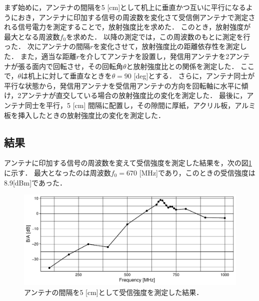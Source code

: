 \documentclass[uplatex,dvipdfmx,a4j,12pt]{jsarticle}
\begin{document}
まず始めに，アンテナの間隔を5 [cm]として机上に垂直かつ互いに平行になるようにおき，アンテナに印加する信号の周波数を変化さて受信側アンテナで測定される信号電力を測定することで，放射強度比を求めた．
このとき，放射強度が最大となる周波数$f_0$を求めた．
以降の測定では，この周波数のもとに測定を行った．
次にアンテナの間隔$r$を変化させて，放射強度比の距離依存性を測定した．
また，適当な距離$r$を介してアンテナを設置し，発信用アンテナを2アンテナが張る面内で回転させ，その回転角$\theta$と放射強度比との関係を測定した．
ここで，$\theta$は机上に対して垂直なときを$\theta = 90$ [deg]とする．
さらに，アンテナ同士が平行な状態から，発信用アンテナを受信用アンテナの方向を回転軸に水平に傾け，2アンテナが直交している場合の放射強度比の変化を測定した．
最後に，アンテナ同士を平行，5 [cm] 間隔に配置し，その隙間に厚紙，アクリル板，アルミ板を挿入したときの放射強度比の変化を測定した．


\subsection{結果}
アンテナに印加する信号の周波数を変えて受信強度を測定した結果を，次の図\ref{fig:5-1}に示す．
最大となったのは周波数$f_0 = 670$ [MHz]であり，このときの受信強度は8.9[dBm]であった．
\begin{figure}[H]
    \centering
    \includegraphics[width=\linewidth]{data/5_1/gain.pdf}
    \caption{アンテナの間隔を5 [cm]として受信強度を測定した結果．}
    \label{fig:5-1}
\end{figure}
\end{document}
